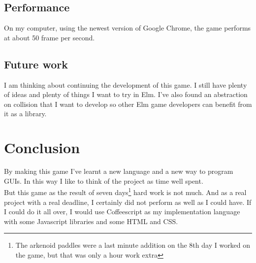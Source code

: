 \documentclass[a4paper]{article}
\begin{document}
\subsection{Performance}
On my computer, using the newest version of Google Chrome, the game performs at
 about 50 frame per second. 

\subsection{Future work}
I am thinking about continuing the development of this game. I still have
 plenty of ideas and plenty of things I want to try in Elm. I've also found
 an abstraction on collision that I want to develop so other Elm game
 developers can benefit from it as a library. 

\section{Conclusion}
By making this game I've learnt a new language and a new way to program GUIs. In
 this way I like to think of the project as time well spent. \\
But this game as the result of seven days\footnote{The arkenoid paddles were a
  last minute addition on the 8th day I worked on the game, but that was only a
  hour work extra} hard work is not much. And as a real project with a real
 deadline, I certainly did not perform as well as I could have. If I could do
 it all over, I would use Coffeescript as my implementation language with some
 Javascript libraries and some HTML and CSS.
 

\newpage




\end{document}
